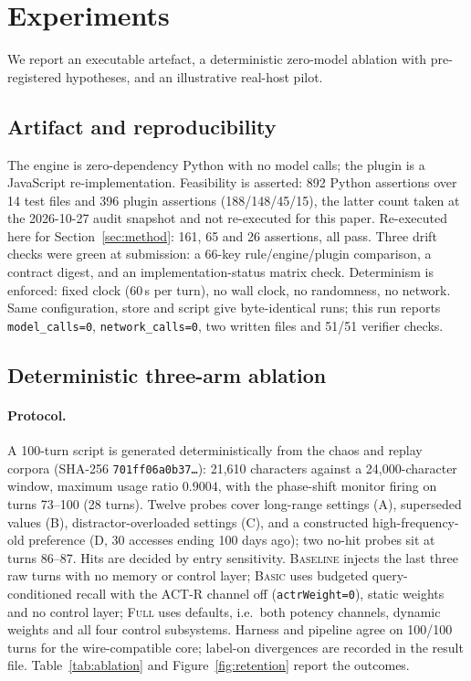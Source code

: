 \section{Experiments}\label{sec:experiments}

We report an executable artefact, a deterministic zero-model ablation with
pre-registered hypotheses, and an illustrative real-host pilot.

\subsection{Artifact and reproducibility}\label{sec:exp:artifact}

The engine is zero-dependency Python with no model calls; the plugin is a
JavaScript re-implementation. Feasibility is asserted: 892 Python assertions over
14 test files and 396 plugin assertions (188/148/45/15), the latter count taken
at the 2026-10-27 audit snapshot and not re-executed for this paper. Re-executed
here for
Section~\ref{sec:method}: 161, 65 and 26 assertions, all pass. Three drift
checks were green at submission: a 66-key rule/engine/plugin comparison, a
contract digest, and an implementation-status matrix check. Determinism is
enforced: fixed clock (60\,s per turn), no wall clock, no randomness, no
network. Same configuration, store and script give byte-identical runs; this run
reports \texttt{model\_calls=0}, \texttt{network\_calls=0}, two written files and
51/51 verifier checks.

\subsection{Deterministic three-arm ablation}\label{sec:exp:ablation}

\paragraph{Protocol.} A 100-turn script is generated deterministically from the
chaos and replay corpora (SHA-256 \texttt{701ff06a0b37\ldots}): 21,610 characters
against a 24,000-character window, maximum usage ratio $0.9004$, with the
phase-shift monitor firing on turns 73--100 (28 turns). Twelve probes cover
long-range settings (A), superseded values (B), distractor-overloaded settings
(C), and a constructed high-frequency-old preference (D, 30 accesses ending 100
days ago); two no-hit probes sit at turns 86--87. Hits are decided by entry
sensitivity. \textsc{Baseline} injects the last three raw turns with no memory or
control layer; \textsc{Basic} uses budgeted query-conditioned recall with the
ACT-R channel off (\texttt{actrWeight=0}), static weights and no control layer;
\textsc{Full} uses defaults, i.e.\ both potency channels, dynamic weights and all
four control subsystems. Harness and pipeline agree on 100/100 turns for the
wire-compatible core; label-on divergences are recorded in the result file.
Table~\ref{tab:ablation} and Figure~\ref{fig:retention} report the outcomes.

